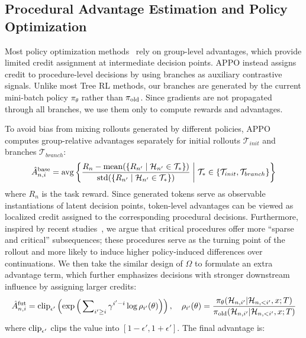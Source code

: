 \documentclass{llmxive}
\begin{document}
\subsection{Procedural Advantage Estimation and Policy Optimization}

Most policy optimization methods~\cite{ji2025tree,xin2025bfs} rely on group-level advantages, which provide limited credit assignment at intermediate decision points. APPO instead assigns credit to procedure-level decisions by using branches as auxiliary contrastive signals. Unlike most Tree RL methods, our branches are generated by the current mini-batch policy $\pi_\theta$ rather than $\pi_{\rm old}$. Since gradients are not propagated through all branches, we use them only to compute rewards and advantages.

To avoid bias from mixing rollouts generated by different policies, APPO computes group-relative advantages separately for initial rollouts $\mathcal{T}_{init}$ and branches $\mathcal{T}_{branch}$:
\begin{equation}\label{eq:dual}
    \hat{A}^{\rm base}_{n,i} = {\rm avg}\left\{
    \frac{R_n - {\rm mean}(\{R_{n'} \mid \mathcal{H}_{n'} \in \mathcal{T}_*\})}
    {{\rm std}(\{R_{n'} \mid \mathcal{H}_{n'} \in \mathcal{T}_*\})}
    \;\middle|\;
    \mathcal{T}_* \in \{\mathcal{T}_{init}, \mathcal{T}_{branch}\}
    \right\}
\end{equation}
where $R_n$ is the task reward. Since generated tokens serve as observable instantiations of latent decision points, token-level advantages can be viewed as localized credit assigned to the corresponding procedural decisions. Furthermore, inspired by recent studies~\cite{huang2026direction,meng2026sparse}, we argue that critical procedures offer more ``sparse and critical'' subsequences; these procedures serve as the turning point of the rollout and more likely to induce higher policy-induced differences over continuations. We then take the similar design of $\Omega$ to formulate an extra advantage term, which further emphasizes decisions with stronger downstream influence by assigning larger credits:
\begin{equation}\label{eq:fut}
    \hat{A}^{\rm fut}_{n,i} = {\rm clip}_{\epsilon'}\left(
    \exp\Big(\sum\nolimits_{i'\ge i}\gamma^{i'-i}\log \rho_{i'}(\theta)\Big)
    \right), \quad 
    \rho_{i'}(\theta)=\frac{\pi_\theta(\mathcal{H}_{n,i'}|\mathcal{H}_{n,<i'}, {x};T)}
    {\pi_{\rm old}(\mathcal{H}_{n,i'}|\mathcal{H}_{n,<i'}, {x};T)}
\end{equation}
where ${\rm clip}_{\epsilon'}$ clips the value into $[1-\epsilon', 1+\epsilon']$. The final advantage is:
\end{document}
